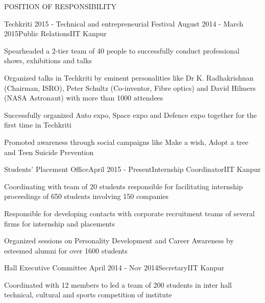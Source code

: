 \documentclass{resume} %
\begin{document}
\begin{rSection}{POSITION OF RESPONSIBILITY}

\begin{rSubsection}{Techkriti 2015 - Technical and entrepreneurial Festival }{August 2014 - March 2015}{Public Relations}{IIT Kanpur}
\item Spearheaded a 2-tier team of 40 people to successfully conduct professional shows, exhibitions and talks
\item Organized talks in Techkriti by eminent personalities like Dr K. Radhakrishnan (Chairman, ISRO), Peter Schultz (Co-inventor, Fibre optics) and David Hilmers (NASA Astronaut) with more than 1000 attendees
\item Successfully organized Auto expo, Space expo and Defence expo together for the first time in Techkriti
\item Promoted awareness through social campaigns like Make a wish, Adopt a tree and Teen Suicide Prevention
\end{rSubsection}


\begin{rSubsection}{Students' Placement Office}{April 2015 - Present}{Internship Coordinator}{IIT Kanpur}
\item Coordinating with team of 20 students responsible for facilitating internship proceedings of 650 students involving 150 companies
 \item Responsible for developing contacts with corporate recruitment teams of several firms for internship and placements 
 \item Organized sessions on Personality Development and Career Awareness by esteemed alumni for over 1600 students
\end{rSubsection}


\begin{rSubsection}{Hall Executive Committee }{April 2014 - Nov 2014}{Secretary}{IIT Kanpur}
\item Coordinated with 12 members to led a team of 200 students in inter hall technical, cultural and sports competition of institute 
\end{rSubsection}

\end{rSection}
\end{document}

